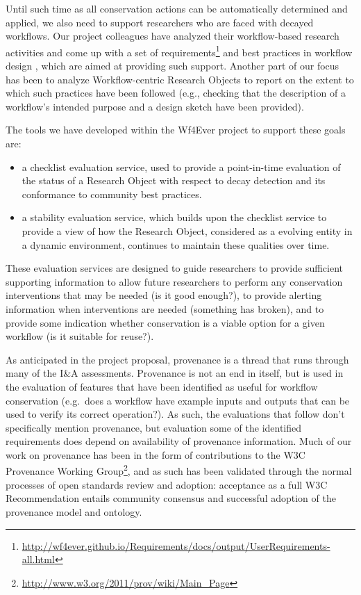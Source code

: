 Until such time as all conservation actions can be automatically
determined and applied, we also need to support researchers who are
faced with decayed workflows. Our project colleagues have analyzed their
workflow-based research activities and come up with a set of
requirements\footnote{\url{http://wf4ever.github.io/Requirements/docs/output/UserRequirements-all.html}}
and best practices in workflow design \cite{Kettne-2012}, which are
aimed at providing such support. Another part of our focus has been to
analyze Workflow-centric Research Objects to report on the extent to
which such practices have been followed (e.g., checking that the
description of a workflow's intended purpose and a design sketch have
been provided).

The tools we have developed within the Wf4Ever project to support these
goals are:

\begin{itemize}
\itemsep1pt\parskip0pt
\item
  a checklist evaluation service, used to provide a point-in-time
  evaluation of the status of a Research Object with respect to decay
  detection and its conformance to community best practices.
\item
  a stability evaluation service, which builds upon the checklist
  service to provide a view of how the Research Object, considered as a
  evolving entity in a dynamic environment, continues to maintain these
  qualities over time.
\end{itemize}

These evaluation services are designed to guide researchers to provide
sufficient supporting information to allow future researchers to perform
any conservation interventions that may be needed (is it good enough?),
to provide alerting information when interventions are needed (something
has broken), and to provide some indication whether conservation is a
viable option for a given workflow (is it suitable for reuse?).

As anticipated in the project proposal, provenance is a thread that runs
through many of the I\&A assessments. Provenance is not an end in
itself, but is used in the evaluation of features that have been
identified as useful for workflow conservation (e.g.~does a workflow
have example inputs and outputs that can be used to verify its correct
operation?). As such, the evaluations that follow don't specifically
mention provenance, but evaluation some of the identified requirements
does depend on availability of provenance information. Much of our work
on provenance has been in the form of contributions to the W3C
Provenance Working Group\footnote{\url{http://www.w3.org/2011/prov/wiki/Main_Page}},
and as such has been validated through the normal processes of open
standards review and adoption: acceptance as a full W3C Recommendation
entails community consensus and successful adoption of the provenance
model and ontology.

